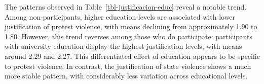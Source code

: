 \documentclass[
  13pt,
]{article}
\begin{document}
The patterns observed in Table~\ref{tbl-justificacion-educ} reveal a
notable trend. Among non-participants, higher education levels are
associated with lower justification of protest violence, with means
declining from approximately 1.90 to 1.80. However, this trend reverses
among those who do participate: participants with university education
display the highest justification levels, with means around 2.29 and
2.27. This differentiated effect of education appears to be specific to
protest violence. In contrast, the justification of state violence shows
a much more stable pattern, with considerably less variation across
educational levels.

\begin{table}

\caption{\label{tbl-justificacion-educ}Justification of violence by
education level and protest participation}

\centering{

\centering\begingroup\fontsize{9}{11}\selectfont

}
\end{table}
\end{document}
